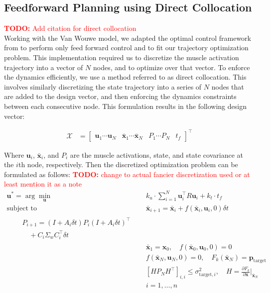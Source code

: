 \documentclass[letterpaper, 10pt, conference]{ieeeconf}
\newcommand{\todo}[1]{\textcolor{red}{\textbf{TODO:} #1}}
\begin{document}
\subsection{Feedforward Planning using Direct Collocation}
\todo{Add citation for direct collocation} \\
Working with the Van Wouwe model, we adapted the optimal control framework from \cite{c7} to perform only feed forward control and to fit our trajectory optimization problem. This implementation required us to discretize the muscle activation trajectory into a vector of $N$ nodes, and to optimize over that vector. To enforce the dynamics efficiently, we use a method referred to as direct collocation. This involves similarly discretizing the state trajectory into a series of $N$ nodes that are added to the design vector, and then enforcing the dynamics constraints between each consecutive node. This formulation results in the following design vector:

\begin{align}
    \mathcal{X} &= \begin{bmatrix}
        \mathbf{u}_1  \cdots \mathbf{u}_N & \mathbf{\bar{x}}_1 \cdots \mathbf{\bar{x}}_N & P_1 \cdots P_N & t_f
    \end{bmatrix}^\top
\end{align}

Where $\mathbf{u}_i$, $\mathbf{\bar{x}}_i$, and $P_i$ are the muscle activations, state, and state covariance at the $i$th node, respectively. Then the discretized optimization problem can be formulated as follows:
\todo{change to actual fancier discretization used or at least mention it as a note} \\

\begin{align}
    \mathbf{u}^* = \arg\min_{\mathbf{u}} &\quad k_u \cdot \sum_{i=1}^{N} \mathbf{u}_i^\top R \mathbf{u}_i + k_t \cdot t_f \label{eq:dcost} \\
    \text{subject to} &\quad \mathbf{\bar{x}}_{i+1} = \mathbf{\bar{x}}_i + f(\mathbf{\bar{x}}_i, \mathbf{u}_i, 0) \delta t \\
    \begin{split}
        &\quad P_{i+1} = (I + A_i \delta t)P_i(I + A_i \delta t)^\top \\
        &\quad \quad + C_i \Sigma_w C_i^\top \delta t
    \end{split} \label{test} \\
    &\quad \mathbf{\bar{x}}_1 = \mathbf{x}_0, \quad f(\mathbf{\bar{x}}_0, \mathbf{u}_0, 0) = 0 \\
    &\quad f(\mathbf{\bar{x}}_N, \mathbf{u}_N, 0) = 0, \quad F_k(\mathbf{\bar{x}}_N) = \mathbf{p}_{\text{target}} \label{eq:dtarget_constraint} \\
    &\quad [HP_NH^\top]_{i,i} \leq \sigma_{\text{target}, i}^2, \quad H = \frac{\partial F_k}{\partial \mathbf{x}}\bigg|_{\mathbf{\bar{x}}_N} \\
    &\quad i = 1, \ldots, n \label{eq:dtarget_variance_constraint}
\end{align}
\end{document}
